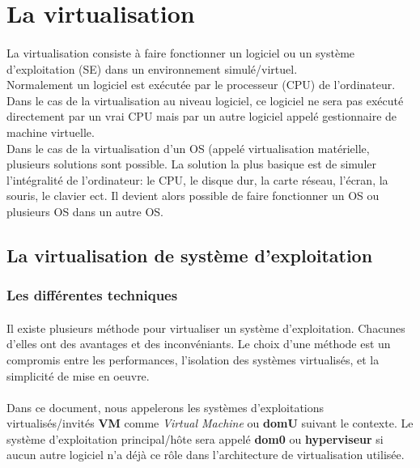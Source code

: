 \section{La virtualisation}
\label{virtualisation}
\paragraph*{}
La virtualisation consiste à faire fonctionner un logiciel ou un système d'exploitation (SE) dans un environnement simulé/virtuel.
\\
Normalement un logiciel est exécutée par le processeur (CPU) de l'ordinateur. Dans le cas de la virtualisation au niveau logiciel,
ce logiciel ne sera pas exécuté directement par un vrai CPU mais par un autre logiciel appelé gestionnaire de machine virtuelle.
\\
Dans le cas de la virtualisation d'un OS (appelé virtualisation matérielle, plusieurs solutions sont possible. La solution la plus basique est de simuler l'intégralité
de l'ordinateur: le CPU, le disque dur, la carte réseau, l'écran, la souris, le clavier ect.
Il devient alors possible de faire fonctionner un OS ou plusieurs OS dans un autre OS.

\subsection{La virtualisation de système d'exploitation}
\label{virtualisation_mat}
\subsubsection{Les différentes techniques}
\paragraph*{}
Il existe plusieurs méthode pour virtualiser un système d'exploitation. Chacunes d'elles ont des avantages et des
inconvéniants. Le choix d'une méthode est un compromis entre les performances, l'isolation des systèmes virtualisés,
et la simplicité de mise en oeuvre.

\paragraph*{}
Dans ce document, nous appelerons les systèmes d'exploitations virtualisés/invités \textbf{VM} comme \emph{Virtual Machine} ou \textbf{domU} suivant le contexte.
Le système d'exploitation principal/hôte sera appelé \textbf{dom0} ou \textbf{hyperviseur} si aucun autre logiciel n'a déjà ce rôle dans l'architecture de virtualisation
utilisée.


